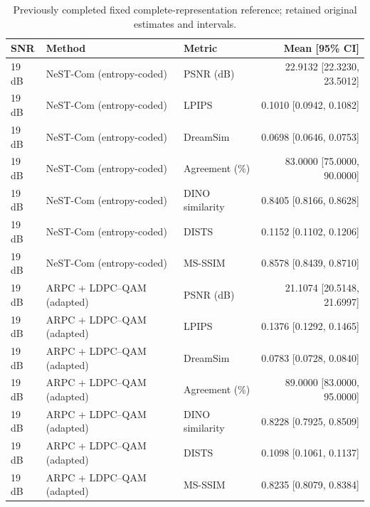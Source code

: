 \begin{table}[t]
\centering\small
\caption{Previously completed fixed complete-representation reference; retained original estimates and intervals.}
\begin{tabular}{lllr}
\toprule
SNR & Method & Metric & Mean [95\% CI] \\
\midrule
19 dB & NeST-Com (entropy-coded) & PSNR (dB) & 22.9132 [22.3230, 23.5012] \\
19 dB & NeST-Com (entropy-coded) & LPIPS & 0.1010 [0.0942, 0.1082] \\
19 dB & NeST-Com (entropy-coded) & DreamSim & 0.0698 [0.0646, 0.0753] \\
19 dB & NeST-Com (entropy-coded) & Agreement (\%) & 83.0000 [75.0000, 90.0000] \\
19 dB & NeST-Com (entropy-coded) & DINO similarity & 0.8405 [0.8166, 0.8628] \\
19 dB & NeST-Com (entropy-coded) & DISTS & 0.1152 [0.1102, 0.1206] \\
19 dB & NeST-Com (entropy-coded) & MS-SSIM & 0.8578 [0.8439, 0.8710] \\
19 dB & ARPC + LDPC--QAM (adapted) & PSNR (dB) & 21.1074 [20.5148, 21.6997] \\
19 dB & ARPC + LDPC--QAM (adapted) & LPIPS & 0.1376 [0.1292, 0.1465] \\
19 dB & ARPC + LDPC--QAM (adapted) & DreamSim & 0.0783 [0.0728, 0.0840] \\
19 dB & ARPC + LDPC--QAM (adapted) & Agreement (\%) & 89.0000 [83.0000, 95.0000] \\
19 dB & ARPC + LDPC--QAM (adapted) & DINO similarity & 0.8228 [0.7925, 0.8509] \\
19 dB & ARPC + LDPC--QAM (adapted) & DISTS & 0.1098 [0.1061, 0.1137] \\
19 dB & ARPC + LDPC--QAM (adapted) & MS-SSIM & 0.8235 [0.8079, 0.8384] \\
\bottomrule
\end{tabular}
\end{table}
